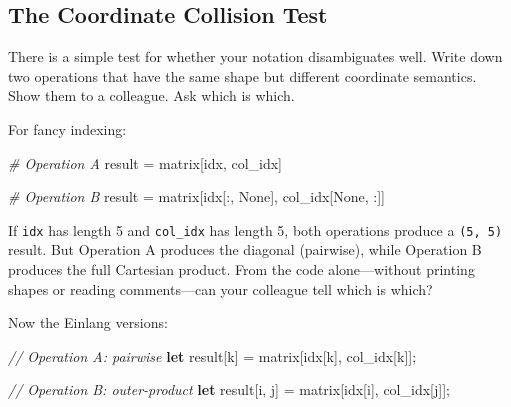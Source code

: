 \documentclass[11pt,titlepage]{article}
\newenvironment{Shaded}{}{}
\newcommand{\CommentTok}[1]{\textcolor[rgb]{0.38,0.63,0.69}{\textit{#1}}}
\newcommand{\KeywordTok}[1]{\textcolor[rgb]{0.00,0.44,0.13}{\textbf{#1}}}
\newcommand{\NormalTok}[1]{#1}
\newcommand{\OperatorTok}[1]{\textcolor[rgb]{0.40,0.40,0.40}{#1}}
\newcommand{\VariableTok}[1]{\textcolor[rgb]{0.10,0.09,0.49}{#1}}
\begin{document}
\vspace{2em}

\hypertarget{the-coordinate-collision-test}{%
\subsection{The Coordinate Collision
Test}\label{the-coordinate-collision-test}}

There is a simple test for whether your notation disambiguates well.
Write down two operations that have the same shape but different
coordinate semantics. Show them to a colleague. Ask which is which.

For fancy indexing:

\begin{Shaded}
\begin{Highlighting}[]
\CommentTok{# Operation A}
\NormalTok{result }\OperatorTok{=}\NormalTok{ matrix[idx, col_idx]}

\CommentTok{# Operation B}
\NormalTok{result }\OperatorTok{=}\NormalTok{ matrix[idx[:, }\VariableTok{None}\NormalTok{], col_idx[}\VariableTok{None}\NormalTok{, :]]}
\end{Highlighting}
\end{Shaded}

If \texttt{idx} has length 5 and \texttt{col\_idx} has length 5, both
operations produce a \texttt{(5,\ 5)} result. But Operation A produces
the diagonal (pairwise), while Operation B produces the full Cartesian
product. From the code alone---without printing shapes or reading
comments---can your colleague tell which is which?

Now the Einlang versions:

\begin{Shaded}
\begin{Highlighting}[]
\CommentTok{// Operation A: pairwise}
\KeywordTok{let}\NormalTok{ result}\OperatorTok{[}\NormalTok{k}\OperatorTok{]}\NormalTok{ = matrix}\OperatorTok{[}\NormalTok{idx}\OperatorTok{[}\NormalTok{k}\OperatorTok{]}\NormalTok{, col_idx}\OperatorTok{[}\NormalTok{k}\OperatorTok{]]}\NormalTok{;}

\CommentTok{// Operation B: outer-product}
\KeywordTok{let}\NormalTok{ result}\OperatorTok{[}\NormalTok{i, j}\OperatorTok{]}\NormalTok{ = matrix}\OperatorTok{[}\NormalTok{idx}\OperatorTok{[}\NormalTok{i}\OperatorTok{]}\NormalTok{, col_idx}\OperatorTok{[}\NormalTok{j}\OperatorTok{]]}\NormalTok{;}
\end{Highlighting}
\end{Shaded}
\end{document}
